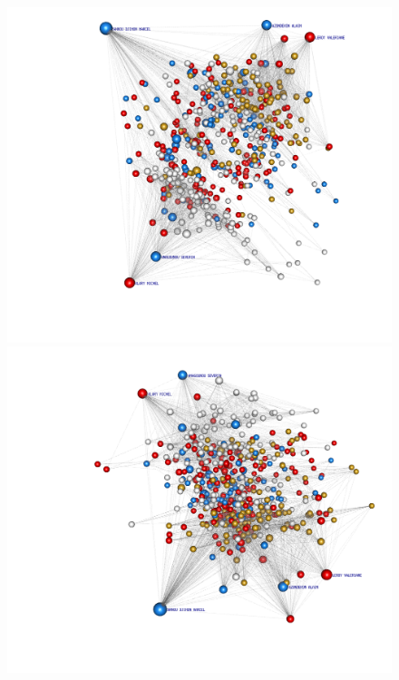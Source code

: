 \begin{figure}[!h]
\center
\includegraphics[scale=0.2,trim={5cm 0 0 0}]{Chapters/hiv/statMod/lnm_mod1.png}
\vspace{0px}\\
\includegraphics[scale=0.2,trim={5cm 0 0 5cm}]{Chapters/hiv/statMod/lnm_mod4_allNodal.png}
\vspace{2px}\\

\end{figure}
